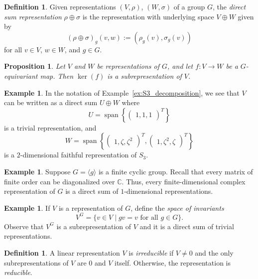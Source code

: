 \documentclass[12pt]{article}
\theoremstyle{plain}
\newtheorem{proposition}[theorem]{Proposition}
\theoremstyle{definition}
\newtheorem{definition}[theorem]{Definition}
\newtheorem{example}[theorem]{Example}
\theoremstyle{remark}
\numberwithin{equation}{section}
\begin{document}
\begin{definition}
Given representations $(V,\rho)$, $(W,\sigma)$ of a group $G$,
the \emph{direct sum representation} $\rho \oplus \sigma$
is the representation with underlying space $V \oplus W$ given by
\[ (\rho \oplus \sigma)_g (v,w) := ( \rho_g(v), \sigma_g(v) ) \]
for all $v \in V$, $w \in W$, and $g \in G$.
\end{definition}

\begin{proposition}
Let $V$ and $W$ be representations of $G$, and let
$f : V \to W$ be a $G$-equivariant map.
Then $\ker(f)$ is a subrepresentation of $V$.
\end{proposition}

\begin{example}
In the notation of
Example~\ref{ex:S3_decomposition}, we see that $V$ can be written
as a direct sum $U \oplus W$ where
\[
U = \operatorname{span}\left\{ \begin{pmatrix} 1,1,1 \end{pmatrix}^T
\right\}
\]
is a trivial representation, and
\[
W = \operatorname{span}\left\{
\begin{pmatrix}1,\zeta,\zeta^2\end{pmatrix}^T,
\begin{pmatrix}1,\zeta^2,\zeta\end{pmatrix}^T
\right\}
\]
is a $2$-dimensional faithful representation of $S_3$.
\end{example}

\begin{example}
Suppose $G=\langle g \rangle$ is a finite cyclic group.
Recall that every matrix of finite order can be diagonalized
over $\mathbb{C}$.
Thus, every finite-dimensional complex representation of
$G$ is a direct sum of $1$-dimensional representations.
\end{example}

\begin{example}
If $V$ is a representation of $G$, define the \emph{space of invariants}
\[
V^G = \{ v \in V \mid gv=v \textrm{ for all } g \in G \}.
\]
Observe that $V^G$ is a subrepresentation of $V$ and it is a direct sum
of trivial representations.
\end{example}

\begin{definition}
A linear representation $V$ is \emph{irreducible} if $V \ne 0$ and the only
subrepresentations of $V$ are $0$ and $V$ itself.
Otherwise, the representation is \emph{reducible}.
\end{definition}
\end{document}
